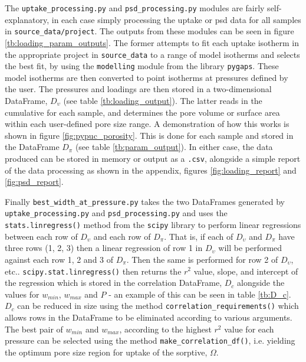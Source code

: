 The \verb|uptake_processing.py| and \verb|psd_processing.py| modules are fairly self-explanatory, in each case simply processing the uptake or \acrshort{psd} data for all samples in \verb|source_data/project|. The outputs from these modules can be seen in figure \ref{tb:loading_param_outputs}. The former attempts to fit each uptake isotherm in the appropriate project in \verb|source_data| to a range of model isotherms and selects the best fit, by using the \verb|modelling| module from the library \verb|pygaps|.\citep{Iacomi2019pyGAPS} These model isotherms are then converted to point isotherms at pressures defined by the user. The pressures and loadings are then stored in a two-dimensional DataFrame, $D_\upsilon$ (see table \ref{tb:loading_output}). The latter reads in the cumulative  for each sample, and determines the pore volume or surface area within each user-defined pore size range. A demonstration of how this works is shown in figure \ref{fig:pypuc_porosity}. This is done for each sample and stored in the DataFrame $D_\pi$ (see table \ref{tb:param_output}). In either case, the data produced can be stored in memory or output as a \verb|.csv|, alongside a simple report of the data processing as shown in the appendix, figures \ref{fig:loading_report} and \ref{fig:psd_report}.

Finally \verb|best_width_at_pressure.py| takes the two DataFrames generated by \verb|uptake_processing.py| and \verb|psd_processing.py| and uses the \verb|stats.linregress()| method from the \verb|scipy| library\citep{SciPy2020} to perform linear regressions between each row of $D_\upsilon$ and each row of $D_\pi$. That is, if each of $D_\upsilon$ and $D_\pi$ have three rows (1, 2, 3) then a linear regression of row 1 in $D_\upsilon$ will be performed against each row 1, 2 and 3 of $D_\pi$. Then the same is performed for row 2 of $D_\upsilon$, etc.. \verb|scipy.stat.linregress()| then returns the $r^2$ value, slope, and intercept of the regression which is stored in the correlation DataFrame, $D_c$ alongside the values for $w_{min}$, $w_{max}$ and $P$ - an example of this can be seen in table \ref{tb:D_c}. $D_c$ can be reduced in size using the method \verb|correlation_requirements()| which allows rows in the DataFrame to be eliminated according to various arguments. The best pair of $w_{min}$ and $w_{max}$, according to the highest $r^2$ value for each pressure can be selected using the method \verb|make_correlation_df()|, i.e. yielding the optimum pore size region for uptake of the sorptive, $\Omega$.

